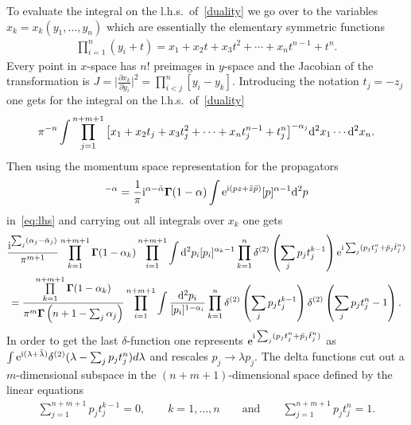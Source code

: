 \documentclass[pdftex]{sigma}
\numberwithin{equation}{section}
\begin{document}
To evaluate the integral on the l.h.s.\ of~\eqref{duality} we go over to the variables $x_k=x_k(y_1,\ldots,y_n)$ which are essentially the elementary symmetric functions
\begin{gather*}%
\prod_{i=1}^n (y_i+t) = x_1+x_2 t+x_3 t^2 +\cdots +x_{n} t^{n-1} + t^n.
\end{gather*}
Every point in $x$-space has $n!$ preimages in $y$-space and the Jacobian of the transformation is $J = \big|\frac{\partial x_k}{\partial y_i}\big|^2 = \prod\limits_{i<j}^{n} [y_i-y_k]$. Introducing the notation $t_j=-z_j$ one gets for the integral on the l.h.s.\ of~\eqref{duality}
\begin{gather}\label{eq:lhs}
\pi^{-n} \int\prod_{j=1}^{n+m+1}
\big[x_1+x_2 t_j+x_3 t_j^2 +\cdots +x_{n}t_j^{n-1} +t_j^n\big]^{-\alpha_j}
{\rm d}^2 x_1\cdots {\rm d}^2 x_{n}.
\end{gather}
Then using the momentum space representation for the propagators
\begin{gather*}
[z]^{-\alpha}=\frac1{\pi} {\rm i}^{\alpha-\bar\alpha} \boldsymbol\Gamma(1-\alpha)
\int {\rm e}^{{\rm i}(pz+\bar z\bar p)} [p]^{\alpha-1} {\rm d}^2p
\end{gather*}
in~\eqref{eq:lhs} and carrying out all integrals over $x_k$ one gets
\begin{gather*}
\frac{ {\rm i}^{\sum_j (\alpha_j-\bar \alpha_j)}}{\pi^{m+1}} \prod_{k=1}^{n+m+1} \boldsymbol\Gamma(1-\alpha_k)
\prod_{i=1}^{n+m+1} \int {\rm d}^2p_i [p_i]^{\alpha_k-1} \prod_{k=1}^{n}\delta^{(2)}\left(\sum_j p_j t_j^{k-1}\right)
{\rm e}^{{\rm i}\sum_j ( p_j t_j^n+ \bar p_j \bar t_j^n)}\\
= \frac{\prod\limits_{k=1}^{n+m+1} \boldsymbol\Gamma(1-\alpha_k)}{\pi^m\boldsymbol\Gamma\left(n+1-\sum_j \alpha_j\right)}
 \prod_{i=1}^{n+m+1} \int
\frac{{\rm d}^2p_i}{ [p_i]^{1-\alpha_i}} \prod\limits_{k=1}^{n}\delta^{(2)}\left(\sum_j p_j t_j^{k-1}\right)
\delta^{(2)}\left(\sum_j p_j t_j^{n}-1\right).
\end{gather*}
In order to get the last $\delta$-function one represents ${\rm e}^{{\rm i}\sum_j ( p_j t_j^n+ \bar p_j \bar t_j^n)}$ as
$\int {\rm e}^{{\rm i}(\lambda+\bar\lambda)}\delta^{(2)}(\lambda-\sum_j p_j t_j^n) d\lambda$ and rescales $p_j\to\lambda p_j$. The delta
functions cut out a $m$-dimensional subspace in the $(n+m+1)$-dimensional space defined by the linear equations
\begin{gather}\label{sys}
\sum_{j=1}^{n+m+1} p_j t_j^{k-1}=0, \qquad k=1,\ldots, n \qquad \text{and} \qquad \sum_{j=1}^{n+m+1} p_j t_j^{n}=1 .
\end{gather}
\end{document}

